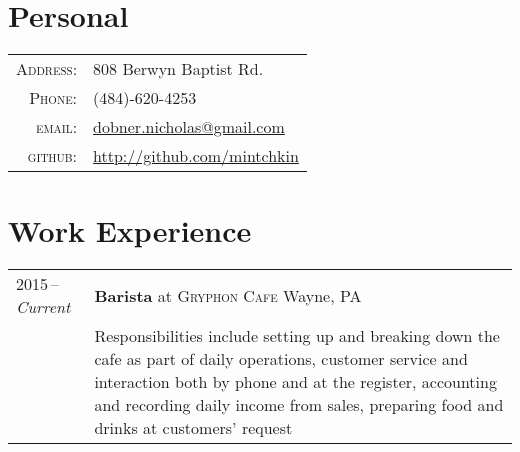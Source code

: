 \documentclass[a4paper,10pt]{article}
\begin{document}
\pagestyle{empty} %

\newfontfamily{} %

\par{\bigskip\par}

\section{Personal}
\begin{tabular}{rl}
    \textsc{Address:}   & 808 Berwyn Baptist Rd. \\
    \textsc{Phone:}     & (484)-620-4253 \\
    \textsc{email:}     & \href{mailto:dobner.nicholas@gmail.com}{dobner.nicholas@gmail.com} \\
    \textsc{github:}    & \href{https://github.com/mintchkin}{http://github.com/mintchkin}
\end{tabular}

\section{Work Experience}
\begin{tabularx}{\textwidth}{@{}p{6em}|X@{}}
    2015\,--\,\emph{Current}& \textbf{Barista} at \textsc{Gryphon Cafe} \hfill Wayne, PA \\
    & \footnotesize{Responsibilities include setting up and breaking down the cafe as part of daily operations, customer service and interaction both by phone and at the register, accounting and recording daily income from sales, preparing food and drinks at customers' request} \\
\end{tabularx}
\end{document}
